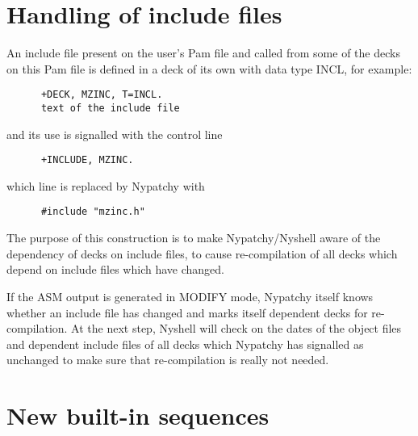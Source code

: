 \section{Handling of include files}

An include file present on the user's Pam file and called from some
of the decks on this Pam file is defined in a deck of its own with
data type INCL, for example:
\begin{verbatim}
      +DECK, MZINC, T=INCL.
      text of the include file
\end{verbatim}
and its use is signalled with the control line
\begin{verbatim}
      +INCLUDE, MZINC.
\end{verbatim}
which line is replaced by Nypatchy with
\begin{verbatim}
      #include "mzinc.h"
\end{verbatim}

The purpose of this construction is to make Nypatchy/Nyshell aware
of the dependency of decks on include files, to cause re-compilation
of all decks which depend on include files which have changed.

If the ASM output is generated in MODIFY mode, Nypatchy itself
knows whether an include file has changed and marks itself dependent
decks for re-compilation. At the next step, Nyshell will check on
the dates of the object files and dependent include files of all
decks which Nypatchy has signalled as unchanged to make sure that
re-compilation is really not needed.


\section{New built-in sequences}

\renewcommand{\labelenumi}{6.\theenumi)\ }

